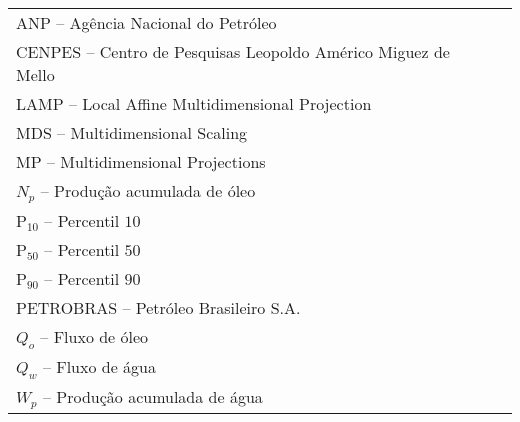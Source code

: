 
\begin{thenotations}

  \noindent
  \begin{tabular}{ll}
    ANP -- Agência Nacional do Petróleo\\
    CENPES -- Centro de Pesquisas Leopoldo Américo Miguez de Mello\\
    LAMP -- Local Affine Multidimensional Projection\\
    MDS -- Multidimensional Scaling\\
    MP -- Multidimensional Projections\\
    $N_p$ -- Produção acumulada de óleo\\
    P$_{10}$ -- Percentil $10$\\
    P$_{50}$ -- Percentil $50$\\
    P$_{90}$ -- Percentil $90$\\
    PETROBRAS -- Petróleo Brasileiro S.A.\\
    $Q_o$ -- Fluxo de óleo\\
    $Q_w$ -- Fluxo de água\\
    $W_p$ -- Produção acumulada de água\\
  \end{tabular}

\end{thenotations}